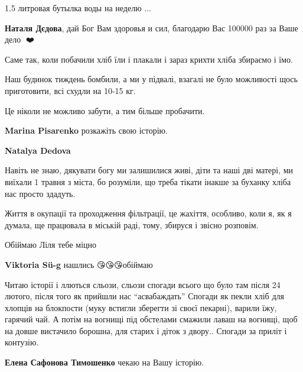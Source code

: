 
1.5 литровая бутылка воды на неделю ...

\textbf{Наталя Дєдова}, дай Бог Вам здоровья и сил, благодарю Вас 100000 раз за Ваше дело 🙏❤️


Саме так, коли побачили хліб їли і плакали і зараз крихти хліба збираємо і їмо.

Наш будинок тиждень бомбили, а ми у підвалі, взагалі не було можливості щось
приготовити, всі схудли на 10-15 кг.

Це ніколи не можливо забути, а тим більше пробачити.

\begin{itemize} %
\textbf{Marina Pisarenko} розкажіть свою історію. 💛

\textbf{Natalya Dedova} 

Навіть не знаю, дякувати богу ми залишилися живі, діти та наші дві матері, ми
виїхали 1 травня з міста, бо розуміли, що треба тікати інакше за буханку хліба
нас просто здадуть.

Життя в окупації та проходження фільтрації, це жахіття, особливо, коли я, як я
думала, ще працювала в міській раді, тому, збируся і звісно розповім.

\end{itemize} %


Обіймаю Ліля тебе міцно

\begin{itemize} %
\textbf{Viktoria Sü-g} нашлись 😘😘😘обіймаю 🤗
\end{itemize} %


Читаю історії і ллються сльози, сльози спогади всього що було там після 24
лютого, після того як прийшли нас \enquote{асвабаждать} Спогади як пекли хліб для
хлопців на блокпости (муку встигли зберегти зі своєї пекарні), варили їжу,
гарячий чай. А потім на вогнищі під обстелами смажили лаваш на вогнищі, щоб на
довше вистачило борошна, для старих і діток з двору.. Спогади за приліт і
контузію.

\begin{itemize} %
\textbf{Елена Сафонова Тимошенко} чекаю на Вашу історію. 💛
\end{itemize} %

